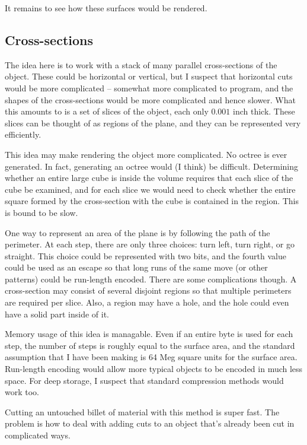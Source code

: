 \documentclass[titlepage,oneside,10pt]{article}
\begin{document}
It remains to see how these surfaces would be rendered.

\subsection{Cross-sections}

The idea here is to work with a stack of many parallel cross-sections
of the object. These could be horizontal or vertical, but I suspect
that horizontal cuts would be more complicated -- somewhat more
complicated to program, and the shapes of the cross-sections would be
more complicated and hence slower. What this amounts to is a set of
slices of the object, each only $0.001$ inch thick. These slices can
be thought of as regions of the plane, and they can be represented
very efficiently. 

This idea may make rendering the object more complicated. No octree is
ever generated. In fact, generating an octree would (I think) be
difficult. Determining whether an entire large cube is inside the
volume requires that each slice of the cube be examined, and for each
slice we would need to check whether the entire square formed by the
cross-section with the cube is contained in the region. This is bound
to be slow.

One way to represent an area of the plane is by following the path of
the perimeter. At each step, there are only three choices: turn left,
turn right, or go straight. This choice could be represented with two
bits, and the fourth value could be used as an escape so that long
runs of the same move (or other patterns) could be run-length
encoded. There are some complications though. A cross-section may
consist of several disjoint regions so that multiple perimeters are
required per slice. Also, a region may have a hole, and the hole could
even have a solid part inside of it.

Memory usage of this idea is managable. Even if an entire byte is used
for each step, the number of steps is roughly equal to the surface area,
and the standard assumption that I have been making is 64 Meg square
units for the surface area. Run-length encoding would allow more
typical objects to be encoded in much less space. For deep storage, I
suspect that standard compression methods would work too.

Cutting an untouched billet of material with this method is super
fast. The problem is how to deal with adding cuts to an object that's
already been cut in complicated ways. 
\end{document}
